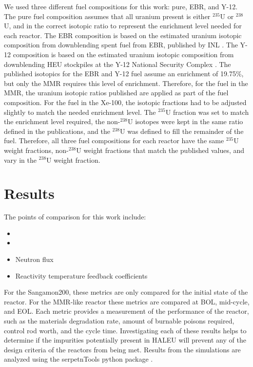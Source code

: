 We used three different fuel compositions for this work: pure, \gls{EBR}, 
and Y-12. The pure fuel composition assumes that all uranium present is 
either $^{235}$U or $^{238}$U, and in the correct isotopic ratio to 
represent the enrichment level needed for each reactor. The \gls{EBR} 
composition is based on the estimated uranium isotopic composition from 
downblending spent fuel from \gls{EBR}, published by \gls{INL} 
\cite{vaden_isotopic_2018}. The Y-12 composition is based on the 
estimated uranium isotopic composition from downblending \gls{HEU} 
stockpiles at the Y-12 National Security Complex \cite{nelson_foreign_2010}.
The published isotopics for the \gls{EBR} and Y-12 fuel assume an enrichment 
of 19.75\%, but only the \gls{MMR} requires this level of enrichment. 
Therefore, for the fuel in the \gls{MMR}, the uranium isotopic ratios 
published are applied as part of the fuel composition. For the fuel in the 
Xe-100, the isotopic fractions had to be adjusted slightly to match the 
needed enrichment level. The $^{235}$U fraction was set to match the 
enrichment level required, the non-$^{238}$U isotopes were kept in the 
same ratio defined in the publications, and the $^{238}$U was defined to fill 
the remainder of the fuel. Therefore, all three fuel compositions for each 
reactor have the same $^{235}$U weight fractions, non-$^{238}$U weight
fractions that match the published values, and vary in the $^{238}$U 
weight fraction. 

\section{Results}
The points of comparison for this work include:
\begin{itemize} 
        \item \keff 
        \item \betaEff
        \item Neutron flux
        \item Reactivity temperature feedback coefficients
\end{itemize}

For the Sangamon200, these metrics are only compared for the initial 
state of the reactor. For the \gls{MMR}-like reactor these metrics 
are compared at \gls{BOL}, mid-cycle, and \gls{EOL}. Each metric provides a 
measurement of the performance of 
the reactor, such as the materials degradation rate, amount of burnable 
poisons required, control rod worth, and the cycle time. Investigating 
each of these results helps to determine if the impurities potentially 
present in \gls{HALEU} will prevent any of the design criteria of the 
reactors from being met. Results from the simulations are analyzed using 
the serpetnTools python package \cite{johnson_serpenttools_2020}. 

